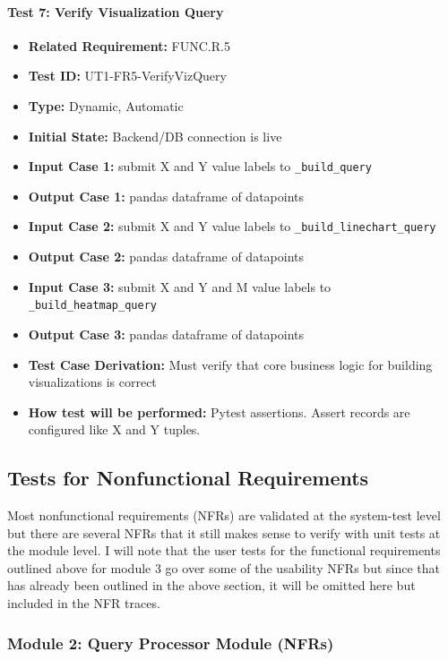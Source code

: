 \documentclass[12pt, titlepage]{article}
\begin{document}
\begin{flushleft}
\paragraph{Test 7: Verify Visualization Query}
\begin{itemize}
    \item \textbf{Related Requirement:} FUNC.R.5
    \item \textbf{Test ID:} UT1-FR5-VerifyVizQuery
    \item \textbf{Type:} Dynamic, Automatic
    \item \textbf{Initial State:} Backend/DB connection is live
    \item \textbf{Input Case 1:} submit X and Y value labels to \texttt{\_build\_query}
    \item \textbf{Output Case 1:} pandas dataframe of datapoints
    \item \textbf{Input Case 2:} submit X and Y value labels to \texttt{\_build\_linechart\_query}
    \item \textbf{Output Case 2:} pandas dataframe of datapoints
     \item \textbf{Input Case 3:} submit X and Y and M value labels to \texttt{\_build\_heatmap\_query}
    \item \textbf{Output Case 3:} pandas dataframe of datapoints
    \item \textbf{Test Case Derivation:} Must verify that core business logic for building visualizations is correct
    \item \textbf{How test will be performed:} Pytest assertions. Assert records are configured like X and Y tuples.
\end{itemize}

\subsection{Tests for Nonfunctional Requirements}

\par{Most nonfunctional requirements (NFRs) are validated at the system-test
level but there are several NFRs that it still makes sense to verify with unit
tests at the module level. I will note that the user tests for the functional requirements outlined above for module 3
go over some of the usability NFRs but since that has already been outlined in the above section, it will be omitted here but included in the NFR traces.}

\subsubsection{Module 2: Query Processor Module (NFRs)}


\end{flushleft}
\end{document}
